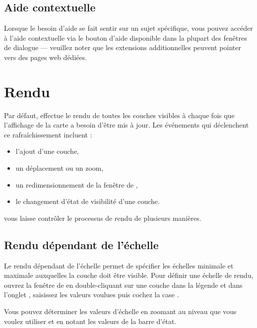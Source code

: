 \subsection{Aide contextuelle} \label{context_help}

Lorsque le besoin d'aide se fait sentir sur un sujet spécifique, vous pouvez accéder à l'aide contextuelle via le bouton d'aide disponible dans la plupart des fenêtres de dialogue — veuillez noter que les extensions additionnelles peuvent pointer vers des pages web dédiées.

\section{Rendu} \label{subsec:redraw_events} 

Par défaut, \qg effectue le rendu de toutes les couches visibles à chaque fois que l'affichage de la carte a besoin d'être mis à jour. Les événements qui déclenchent ce rafraîchissement incluent :

\begin{itemize}[label=--]
\item l'ajout d'une couche,
\item un déplacement ou un zoom,
\item un redimensionnement de la fenêtre de \qg,
\item le changement d'état de visibilité d'une couche.
\end{itemize}

\qg vous laisse contrôler le processus de rendu de plusieurs manières.

\subsection{Rendu dépendant de l'échelle} 
\label{label_scaledepend}

Le rendu dépendant de l'échelle permet de spécifier les échelles minimale et maximale auxquelles la couche doit être visible. Pour définir une échelle de rendu, ouvrez la fenêtre de  en double-cliquant sur une couche dans la légende et dans l'onglet , saisissez les valeurs voulues puis cochez la case .

Vous pouvez déterminer les valeurs d'échelle en zoomant au niveau que vous voulez utiliser et en notant les valeurs de la barre d'état.

